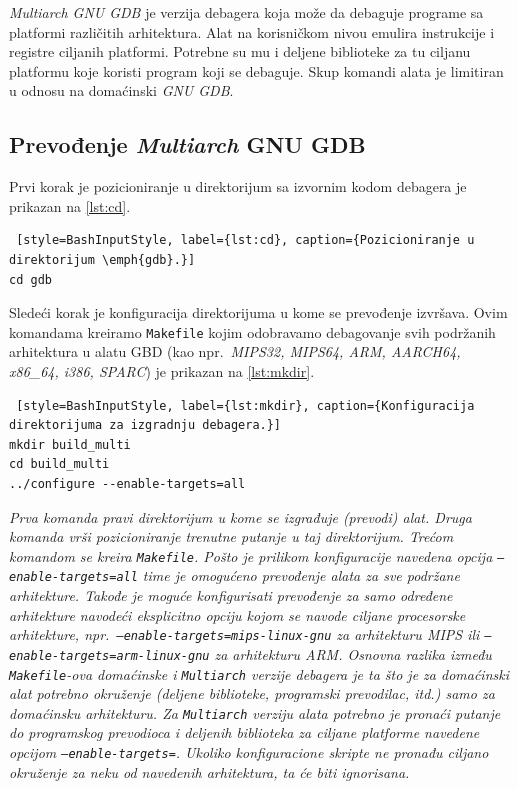 \documentclass[12pt,oneside]{memoir}
\begin{document}
\emph{Multiarch GNU GDB} je verzija debagera koja može da debaguje programe sa platformi različitih arhitektura. Alat na korisničkom nivou emulira instrukcije i registre ciljanih platformi. Potrebne su mu i deljene biblioteke za tu ciljanu platformu koje koristi program koji se debaguje. Skup komandi alata je limitiran u odnosu na domaćinski \emph{GNU GDB}.

\subsection{Prevođenje \emph{Multiarch} GNU GDB}

Prvi korak je pozicioniranje u direktorijum sa izvornim kodom debagera je prikazan na \ref{lst:cd}.
\begin{lstlisting} [style=BashInputStyle, label={lst:cd}, caption={Pozicioniranje u direktorijum \emph{gdb}.}]
cd gdb

\end{lstlisting}

Sledeći korak je konfiguracija direktorijuma u kome se prevođenje izvršava. Ovim komandama kreiramo \texttt{Makefile} kojim odobravamo debagovanje svih podržanih arhitektura u alatu GBD (kao npr.~\emph{MIPS32, MIPS64, ARM, AARCH64, x86\_64, i386, SPARC}) je prikazan na \ref{lst:mkdir}.

\begin{lstlisting} [style=BashInputStyle, label={lst:mkdir}, caption={Konfiguracija direktorijuma za izgradnju debagera.}]
mkdir build_multi
cd build_multi
../configure --enable-targets=all

\end{lstlisting}
\emph{Prva komanda pravi direktorijum u kome se izgrađuje (prevodi) alat. Druga komanda vrši pozicioniranje trenutne putanje u taj direktorijum. Trećom komandom se kreira \texttt{Makefile}. Pošto je prilikom konfiguracije navedena opcija \texttt{--enable-targets=all} time je omogućeno prevođenje alata za sve podržane arhitekture. Takođe je moguće konfigurisati prevođenje za samo određene arhitekture navodeći eksplicitno opciju kojom se navode ciljane procesorske arhitekture, npr.~\texttt{–enable-targets=mips-linux-gnu} za arhitekturu \emph{MIPS} ili \texttt{–enable-targets=arm-linux-gnu} za arhitekturu \emph{ARM}. Osnovna razlika između \texttt{Makefile}-ova domaćinske i \texttt{Multiarch} verzije debagera je ta što je za domaćinski alat potrebno okruženje (deljene biblioteke, programski prevodilac, itd.) samo za domaćinsku arhitekturu. Za \texttt{Multiarch} verziju alata potrebno je pronaći putanje do programskog prevodioca i deljenih biblioteka za ciljane platforme navedene opcijom \texttt{--enable-targets=}. Ukoliko konfiguracione skripte ne pronađu ciljano okruženje za neku od navedenih arhitektura, ta će biti ignorisana.}
\end{document}
